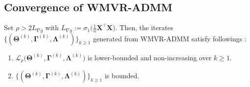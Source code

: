 \documentclass[alpha-refs]{wiley-article}
\begin{document}
\subsection{Convergence of WMVR-ADMM}

\begin{lemma} \label{Lemma2.3}
Set $\rho>2L_{\nabla g}$ with $L_{\nabla g}:=\sigma_{1}\big( \frac{1}{n}\boldsymbol{X}^{\top}\boldsymbol{X}\big)$.
Then, the iterates $\{(\boldsymbol{\Theta}^{(k)},\boldsymbol{\Gamma}^{(k)},\boldsymbol{\Lambda}^{(k)})\}_{k \geq 1}$ generated from WMVR-ADMM satisfy followings : 
\begin{enumerate}
    \item $\mathcal{L}_{\rho} \big( \boldsymbol{\Theta}^{(k)},\boldsymbol{\Gamma}^{(k)},\boldsymbol{\Lambda}^{(k)} \big)$ is lower-bounded and non-increasing over $k \geq 1$.
    \item $\{(\boldsymbol{\Theta}^{(k)},\boldsymbol{\Gamma}^{(k)},\boldsymbol{\Lambda}^{(k)})\}_{k \geq 1}$ is bounded.
\end{enumerate}
\end{lemma}
\end{document}

